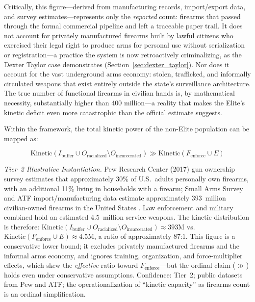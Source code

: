 Critically, this figure---derived from manufacturing records, import/export data, and survey estimates---represents only the \textit{reported} count: firearms that passed through the formal commercial pipeline and left a traceable paper trail. It does not account for privately manufactured firearms built by lawful citizens who exercised their legal right to produce arms for personal use without serialization or registration---a practice the system is now retroactively criminalizing, as the Dexter Taylor case demonstrates (Section~\ref{sec:dexter_taylor}). Nor does it account for the vast underground arms economy: stolen, trafficked, and informally circulated weapons that exist entirely outside the state's surveillance architecture. The true number of functional firearms in civilian hands is, by mathematical necessity, substantially higher than 400 million---a reality that makes the Elite's kinetic deficit even more catastrophic than the official estimate suggests.

Within the framework, the total kinetic power of the non-Elite population can be mapped as:

\begin{equation}\label{eq:10.14-kinetic-power-distribution}
\text{Kinetic}(I_{\text{buffer}} \cup O_{\text{racialized}} \setminus O_{\text{incarcerated}}) \gg \text{Kinetic}(F_{\text{enforce}} \cup E)
\end{equation}

\noindent\textit{Tier~2 Illustrative Instantiation.} Pew Research Center (2017) gun ownership survey estimates that approximately 30\% of U.S.\ adults personally own firearms, with an additional 11\% living in households with a firearm; Small Arms Survey and ATF import/manufacturing data estimate approximately 393~million civilian-owned firearms in the United States \cite{pew_gun_ownership_2017}. Law enforcement and military combined hold an estimated 4.5~million service weapons. The kinetic distribution is therefore: $\text{Kinetic}(I_{\text{buffer}} \cup O_{\text{racialized}} \setminus O_{\text{incarcerated}}) \approx 393\text{M}$ vs.\ $\text{Kinetic}(F_{\text{enforce}} \cup E) \approx 4.5\text{M}$, a ratio of approximately $87\text{:}1$. This figure is a conservative lower bound; it excludes privately manufactured firearms and the informal arms economy, and ignores training, organization, and force-multiplier effects, which skew the \textit{effective} ratio toward $F_{\text{enforce}}$---but the ordinal claim ($\gg$) holds even under conservative assumptions. Confidence: Tier~2; public datasets from Pew and ATF; the operationalization of ``kinetic capacity'' as firearms count is an ordinal simplification.

